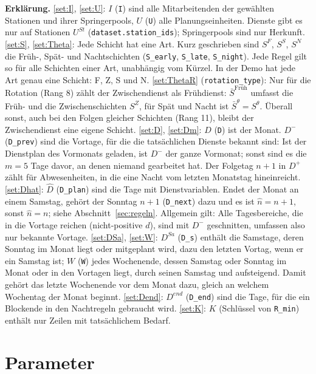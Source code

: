 \documentclass[11pt]{combiArticle}
\newcommand{\Dm}{D^{-}}
\newcommand{\Dp}{D^{+}}
\newcommand{\code}[1]{\texttt{#1}}
\begin{document}
\textbf{Erklärung.}
\eqref{set:I}, \eqref{set:U}: $I$ (\code{I}) sind alle Mitarbeitenden der gewählten Stationen und ihrer
Springerpools, $U$ (\code{U}) alle Planungseinheiten. Dienste gibt es nur auf Stationen $U^{St}$
(\code{dataset.station\_ids}); Springerpools sind nur Herkunft.
\eqref{set:S}, \eqref{set:Theta}: Jede Schicht hat eine Art. Kurz geschrieben sind $S^{F}$, $S^{S}$, $S^{N}$ die
Früh-, Spät- und Nachtschichten (\code{S\_early}, \code{S\_late}, \code{S\_night}). Jede Regel gilt so für alle
Schichten einer Art, unabhängig vom Kürzel. In der Demo hat jede Art genau eine Schicht: F, Z, S und N.
\eqref{set:ThetaR} (\code{rotation\_type}): Nur für die Rotation (Rang 8) zählt der Zwischendienst als
Frühdienst: $\bar S^{\text{Früh}}$ umfasst die Früh- und die Zwischenschichten $S^{Z}$, für Spät und Nacht ist
$\bar S^{\theta} = S^{\theta}$. Überall sonst, auch bei den Folgen gleicher Schichten (Rang 11), bleibt der
Zwischendienst eine eigene Schicht.
\eqref{set:D}, \eqref{set:Dm}: $D$ (\code{D}) ist der Monat. $\Dm$ (\code{D\_prev}) sind die Vortage, für die
die tatsächlichen Dienste bekannt sind: Ist der Dienstplan des Vormonats geladen, ist $\Dm$ der ganze Vormonat;
sonst sind es die $m = 5$ Tage davor, an denen niemand gearbeitet hat. Der Folgetag $n+1$ in $\Dp$ zählt für
Abwesenheiten, in die eine Nacht vom letzten Monatstag hineinreicht.
\eqref{set:Dhat}: $\hat D$ (\code{D\_plan}) sind die Tage mit Dienstvariablen. Endet der Monat an einem Samstag,
gehört der Sonntag $n+1$ (\code{D\_next}) dazu und es ist $\hat n = n+1$, sonst $\hat n = n$; siehe
Abschnitt~\ref{sec:regeln}.
Allgemein gilt: Alle Tagesbereiche, die in die Vortage reichen (nicht-positive $d$), sind mit $\Dm$ geschnitten,
umfassen also nur bekannte Vortage.
\eqref{set:DSa}, \eqref{set:W}: $D^{Sa}$ (\code{D\_s}) enthält die Samstage, deren Sonntag im Monat liegt oder
mitgeplant wird, dazu den letzten Vortag, wenn er ein Samstag ist;
$W$ (\code{W}) jedes Wochenende, dessen Samstag oder Sonntag im Monat oder in den Vortagen liegt, durch seinen
Samstag und aufsteigend. Damit gehört das letzte Wochenende vor dem Monat dazu, gleich an welchem Wochentag der
Monat beginnt.
\eqref{set:Dend}: $D^{end}$ (\code{D\_end}) sind die Tage, für die ein Blockende in den Nachtregeln gebraucht
wird.
\eqref{set:K}: $K$ (Schlüssel von \code{R\_min}) enthält nur Zeilen mit tatsächlichem Bedarf.

\section{Parameter}
\end{document}

